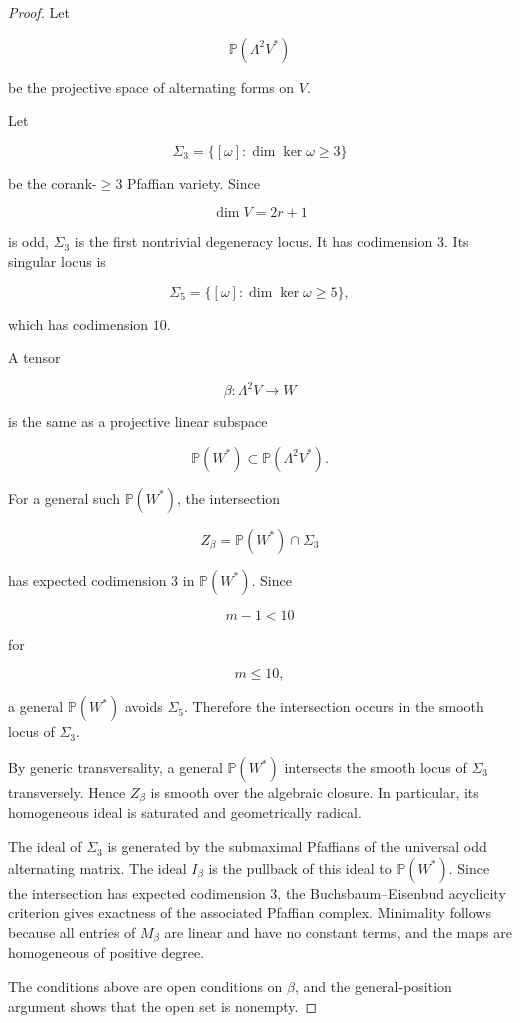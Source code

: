 \documentclass[11pt]{article}
\begin{document}
\begin{proof}

Let

\[
\mathbb P(\Lambda^2V^*)
\]

be the projective space of alternating forms on $V$.

Let

\[
\Sigma_3
=
\{[\omega]:\dim\ker\omega\ge3\}
\]

be the corank-$\ge3$ Pfaffian variety. Since

\[
\dim V=2r+1
\]

is odd, $\Sigma_3$ is the first nontrivial degeneracy locus. It has codimension $3$. Its singular locus is

\[
\Sigma_5
=
\{[\omega]:\dim\ker\omega\ge5\},
\]

which has codimension $10$.

A tensor

\[
\beta:\Lambda^2V\to W
\]

is the same as a projective linear subspace

\[
\mathbb P(W^*)\subset\mathbb P(\Lambda^2V^*).
\]

For a general such $\mathbb P(W^*)$, the intersection

\[
Z_\beta=\mathbb P(W^*)\cap\Sigma_3
\]

has expected codimension $3$ in $\mathbb P(W^*)$. Since

\[
m-1<10
\]

for

\[
m\le10,
\]

a general $\mathbb P(W^*)$ avoids $\Sigma_5$. Therefore the intersection occurs in the smooth locus of $\Sigma_3$.

By generic transversality, a general $\mathbb P(W^*)$ intersects the smooth locus of $\Sigma_3$ transversely. Hence $Z_\beta$ is smooth over the algebraic closure. In particular, its homogeneous ideal is saturated and geometrically radical.

The ideal of $\Sigma_3$ is generated by the submaximal Pfaffians of the universal odd alternating matrix. The ideal $I_\beta$ is the pullback of this ideal to $\mathbb P(W^*)$. Since the intersection has expected codimension $3$, the Buchsbaum--Eisenbud acyclicity criterion gives exactness of the associated Pfaffian complex. Minimality follows because all entries of $M_\beta$ are linear and have no constant terms, and the maps are homogeneous of positive degree.

The conditions above are open conditions on $\beta$, and the general-position argument shows that the open set is nonempty.

\end{proof}
\end{document}
